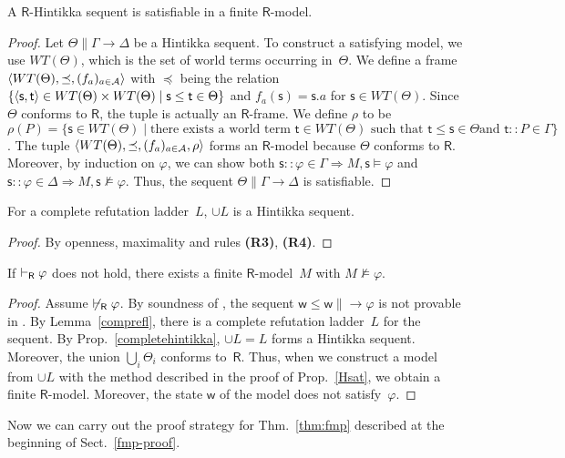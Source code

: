    \begin{proposition}
    \label{Hsat}
    A $\mathsf R$-Hintikka sequent is satisfiable in a finite $\mathsf R$-model.
   \end{proposition}
   \begin{proof}
    \newcommand{\W}{WT(\Theta)}
    Let $\Theta\parallel \Gamma\longrightarrow\Delta$ be a Hintikka sequent.
    To construct a satisfying model, we use $\W$,
    which is the set of world
    terms occurring in~$\Theta$.
    We define a frame $\tuple{\W, \preceq, (f_a)_{a\in\agents}}$ with
    $\preceq$ being the relation $\{\tuple{\mathsf s,\mathsf t}\in
    \W\times \W\mid
    \mathsf s\le
    \mathsf t\in\Theta\}$ and
    $f_a(\mathsf s) = \mathsf s.a$ for $\mathsf s\in\W$\enspace.
    Since $\Theta$ conforms to $\mathsf R$,
    the tuple is actually an $\mathsf R$-frame.
    We define $\rho$ to be $\rho(P) =
    \{\mathsf s\in \W\mid
    \mbox{there exists a world term } \mathsf t \in \W \mbox{ such that }
    \mathsf t\le
    \mathsf s \in \Theta\mbox{
    and }\mathsf t::P\in \Gamma\}$.
    The tuple $\tuple{\W,\preceq,(f_a)_{a\in \agents},\rho}$ forms
    an $\mathsf R$-model because $\Theta$ conforms to $\mathsf R$.
    Moreover, by induction on $\varphi$, we can show both
    $\mathsf s::\varphi\in\Gamma\Longrightarrow M,\mathsf s\models\varphi$
    and
    $\mathsf s::\varphi\in\Delta\Longrightarrow M,\mathsf s\not\models\varphi$.
    Thus, the sequent $\Theta\parallel \Gamma\longrightarrow\Delta$ is satisfiable.
   \end{proof}

   \begin{proposition}
    \label{completehintikka}
    For a complete refutation ladder~$L$,
    $\cup L$ is a Hintikka sequent.
   \end{proposition}
   \begin{proof}
    By openness, maximality and rules \textbf{(R3)}, \textbf{(R4)}.
   \end{proof}

   \begin{lemma}
    \label{R-fmp}
    If $\vdash_{\mathsf R}\varphi$  does not hold, there exists a finite $\mathsf
    R$-model~$M$ with $M\not\models\varphi$.
   \end{lemma}
   \begin{proof}
    Assume $\not\vdash_{\mathsf R}\varphi$.
    By soundness of \LB,
    the sequent $\mathsf w\le\mathsf w\parallel \longrightarrow\varphi$ is not
    provable in \LB.
    By Lemma~\ref{comprefl},
    there is a complete refutation ladder~$L$ for the sequent.
    By Prop.~\ref{completehintikka},
    $\cup L = L$  forms a Hintikka
    sequent.
    Moreover,
    the union $\bigcup_i\Theta_i$ conforms to~$\mathsf
    R$.
    Thus, when we construct a model from $\cup L$ with the method described in
    the proof of Prop.~\ref{Hsat},
    we obtain a finite $\mathsf R$-model.
    Moreover, the state $\mathsf w$ of the model does not satisfy~$\varphi$.
   \end{proof}
   Now we can carry out the proof strategy for Thm.~\ref{thm:fmp} described
   at the beginning of Sect.~\ref{fmp-proof}.

